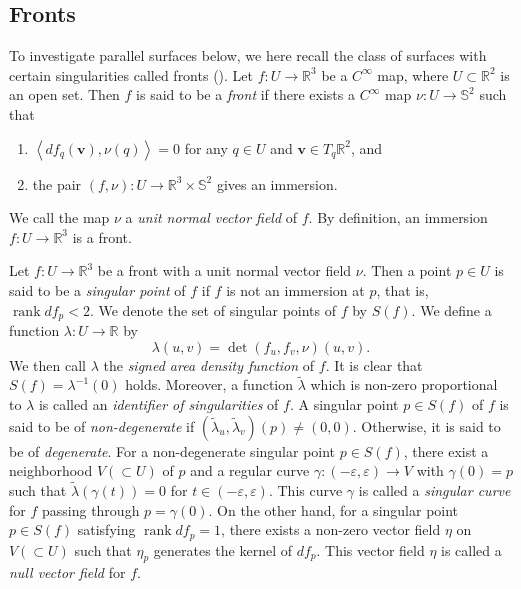 \documentclass[11pt,a4paper,pdflatex,final]{amsart}
\theoremstyle{plain}
\theoremstyle{definition}
\theoremstyle{remark}
\newcommand{\rank}{\operatorname{rank}}
\newcommand{\0}{\bm{0}}
\newcommand{\R}{\mathbb{R}}
\newcommand{\bS}{\mathbb{S}}
\newcommand{\bv}{\bm{v}}
\newcommand{\eps}{\varepsilon}
\newcommand{\til}{\tilde}
\newcommand{\inner}[2]{\left\langle{#1},{#2}\right\rangle}
\numberwithin{equation}{section}
\begin{document}
\subsection{Fronts}
To investigate parallel surfaces below, 
we here recall the class of surfaces with certain singularities 
called fronts (\cite{agv,usy-book}). 
Let $f\colon U\to\R^3$ be a $C^\infty$ map, 
where $U\subset \R^2$ is an open set. 
Then $f$ is said to be a \textit{front} 
if there exists a $C^\infty$ map $\nu\colon U\to\bS^2$ 
such that 
\begin{enumerate}
\item $\inner{df_q(\bv)}{\nu(q)}=0$ for any $q\in U$ and $\bv\in T_q\R^2$, and 
\item the pair $(f,\nu)\colon U\to\R^3\times \bS^2$ gives an immersion.
\end{enumerate}
We call the map $\nu$ a \textit{unit normal vector field} of $f$.
By definition, an immersion $f\colon U\to\R^3$ is a front. 

Let $f\colon U\to\R^3$ be a front with a unit normal vector field $\nu$. 
Then a point $p\in U$ is said to be a \textit{singular point} of $f$ 
if $f$ is not an immersion at $p$, that is, $\rank df_p<2$. 
{We denote the set of singular points of $f$ by $S(f)$.} 
We define a function $\lambda\colon U\to\R$ by 
\begin{equation}\label{eq:lambda}
\lambda(u,v)=\det(f_u,f_v,\nu)(u,v).
\end{equation}
We then call $\lambda$ the \textit{signed area density function} of $f$. 
It is clear that $S(f)=\lambda^{-1}(0)$ holds. 
Moreover, a function $\til{\lambda}$ which is non-zero proportional to $\lambda$ 
is called an \textit{identifier of singularities} of $f$. 
A singular point $p\in S(f)$ of $f$ is said to be of \textit{non-degenerate} 
if $(\tilde{\lambda}_u,\tilde{\lambda}_v)(p)\neq(0,0)$. 
Otherwise, it is said to be of \textit{degenerate}. 
For a non-degenerate singular point $p\in S(f)$, 
there exist a neighborhood $V(\subset U)$ of $p$ 
and a regular curve $\gamma\colon(-\eps,\eps)\to V$ with $\gamma(0)=p$ 
such that $\til{\lambda}(\gamma(t))=0$ for $t\in(-\eps,\eps)$. 
This curve $\gamma$ is called a \textit{singular curve} for $f$ 
passing through $p=\gamma(0)$. 
On the other hand, for a singular point $p\in S(f)$ 
satisfying $\rank df_p=1$, there exists 
a non-zero vector field $\eta$ on $V(\subset U)$ 
such that $\eta_p$ generates the kernel of $df_p$. 
This vector field $\eta$ is called a \textit{null vector field} for $f$. 
\end{document}
